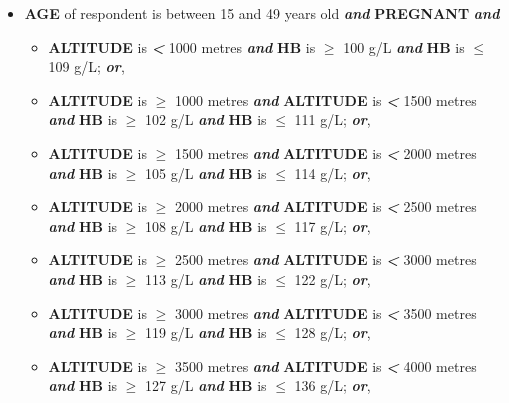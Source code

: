 \documentclass[12pt,a4paper]{article}
\begin{document}
\begin{itemize}
\item
  \textbf{AGE} of respondent is between 15 and 49 years old \textbf{\emph{and}} \textbf{PREGNANT} \textbf{\emph{and}}

  \begin{itemize}
  \item
    \textbf{ALTITUDE} is \textbf{\emph{\textless{}}} 1000 metres \textbf{\emph{and}} \textbf{HB} is \textbf{\emph{\(\geq\)}} 100 g/L \textbf{\emph{and}} \textbf{HB} is \textbf{\emph{\(\leq\)}} 109 g/L; \textbf{\emph{or}},
  \item
    \textbf{ALTITUDE} is \textbf{\emph{\(\geq\)}} 1000 metres \textbf{\emph{and}} \textbf{ALTITUDE} is \textbf{\emph{\textless{}}} 1500 metres \textbf{\emph{and}} \textbf{HB} is \textbf{\emph{\(\geq\)}} 102 g/L \textbf{\emph{and}} \textbf{HB} is \textbf{\emph{\(\leq\)}} 111 g/L; \textbf{\emph{or}},
  \item
    \textbf{ALTITUDE} is \textbf{\emph{\(\geq\)}} 1500 metres \textbf{\emph{and}} \textbf{ALTITUDE} is \textbf{\emph{\textless{}}} 2000 metres \textbf{\emph{and}} \textbf{HB} is \textbf{\emph{\(\geq\)}} 105 g/L \textbf{\emph{and}} \textbf{HB} is \textbf{\emph{\(\leq\)}} 114 g/L; \textbf{\emph{or}},
  \item
    \textbf{ALTITUDE} is \textbf{\emph{\(\geq\)}} 2000 metres \textbf{\emph{and}} \textbf{ALTITUDE} is \textbf{\emph{\textless{}}} 2500 metres \textbf{\emph{and}} \textbf{HB} is \textbf{\emph{\(\geq\)}} 108 g/L \textbf{\emph{and}} \textbf{HB} is \textbf{\emph{\(\leq\)}} 117 g/L; \textbf{\emph{or}},
  \item
    \textbf{ALTITUDE} is \textbf{\emph{\(\geq\)}} 2500 metres \textbf{\emph{and}} \textbf{ALTITUDE} is \textbf{\emph{\textless{}}} 3000 metres \textbf{\emph{and}} \textbf{HB} is \textbf{\emph{\(\geq\)}} 113 g/L \textbf{\emph{and}} \textbf{HB} is \textbf{\emph{\(\leq\)}} 122 g/L; \textbf{\emph{or}},
  \item
    \textbf{ALTITUDE} is \textbf{\emph{\(\geq\)}} 3000 metres \textbf{\emph{and}} \textbf{ALTITUDE} is \textbf{\emph{\textless{}}} 3500 metres \textbf{\emph{and}} \textbf{HB} is \textbf{\emph{\(\geq\)}} 119 g/L \textbf{\emph{and}} \textbf{HB} is \textbf{\emph{\(\leq\)}} 128 g/L; \textbf{\emph{or}},
  \item
    \textbf{ALTITUDE} is \textbf{\emph{\(\geq\)}} 3500 metres \textbf{\emph{and}} \textbf{ALTITUDE} is \textbf{\emph{\textless{}}} 4000 metres \textbf{\emph{and}} \textbf{HB} is \textbf{\emph{\(\geq\)}} 127 g/L \textbf{\emph{and}} \textbf{HB} is \textbf{\emph{\(\leq\)}} 136 g/L; \textbf{\emph{or}},

\end{itemize}
\end{itemize}
\end{document}
